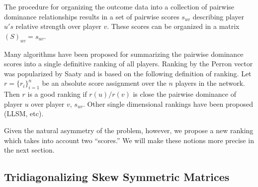 \documentclass[a4,11pt,twoside,leqno]{report}
\theoremstyle{definition}
\theoremstyle{remark}
\numberwithin{equation}{section}
\begin{document}
The procedure for organizing the outcome data into a collection of pairwise
dominance relationships results in a set of pairwise scores $s_{uv}$ describing
player $u's$ relative strength over player $v$.  These scores can be organized
in a matrix $(S)_{uv} = s_{uv}$.

Many algorithms have been proposed for summarizing the pairwise dominance scores
into a single definitive ranking of all players.  Ranking by the Perron vector
was popularized by Saaty and is based on the following definition of ranking.
Let $r = \{r_i\}_{i=1}^n$ be an absolute score assignment over the $n$ players
in the network.  Then $r$ is a good ranking if $r(u)/r(v)$ is close the pairwise
dominance of player $u$ over player $v$, $s_{uv}$.  Other single dimensional
rankings have been proposed (LLSM, etc).

Given the natural asymmetry of the problem, however, we propose a new ranking
which takes into account two ``scores.'' We will make these notions more precise
in the next section.

\subsection{Tridiagonalizing Skew Symmetric Matrices}
\end{document}
